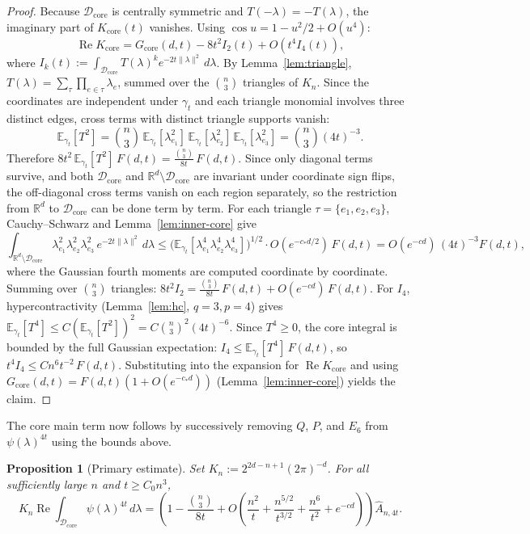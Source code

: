 \documentclass[11pt]{article}
\newtheorem{proposition}[theorem]{Proposition}
\theoremstyle{definition}
\newcommand{\R}{\mathbb{R}}
\newcommand{\E}{\mathbb{E}}
\newcommand{\corereg}{\mathcal{D}_\mathrm{core}}
\newcommand{\RePart}{\operatorname{Re}}
\newcommand{\core}{G_{\mathrm{core}}}
\newcommand{\Ahat}{\hat A_{n,4t}}
\begin{document}
\begin{proof}
Because \(\corereg\) is centrally symmetric and \(T(-\lambda)=-T(\lambda)\), the imaginary part of \(K_{\mathrm{core}}(t)\) vanishes. Using \(\cos u=1-u^2/2+O(u^4)\):
\[
  \RePart K_{\mathrm{core}}=\core(d,t)-8t^2 I_2(t)+O(t^4 I_4(t)),
\]
where \(I_k(t):=\int_{\corereg}T(\lambda)^k e^{-2t\|\lambda\|^2}\,d\lambda\).
By Lemma~\ref{lem:triangle}, \(T(\lambda)=\sum_\tau\prod_{e\in\tau}\lambda_e\), summed over the \(\binom n3\) triangles of \(K_n\). Since the coordinates are independent under \(\gamma_t\) and each triangle monomial involves three distinct edges, cross terms with distinct triangle supports vanish:
\[
  \E_{\gamma_t}[T^2]
  =\binom{n}{3}\,\E_{\gamma_t}[\lambda_{e_1}^2]\,\E_{\gamma_t}[\lambda_{e_2}^2]\,\E_{\gamma_t}[\lambda_{e_3}^2]
  =\binom{n}{3}(4t)^{-3}.
\]
Therefore \(8t^2\,\E_{\gamma_t}[T^2]\,F(d,t)=\frac{\binom{n}{3}}{8t}\,F(d,t)\).
Since only diagonal terms survive, and both \(\corereg\) and \(\R^d\setminus\corereg\) are invariant under coordinate sign flips, the off-diagonal cross terms vanish on each region separately, so the restriction from \(\R^d\) to \(\corereg\) can be done term by term. For each triangle \(\tau=\{e_1,e_2,e_3\}\), Cauchy--Schwarz and Lemma~\ref{lem:inner-core} give
\[
  \int_{\R^d\setminus\corereg}\!\lambda_{e_1}^2\lambda_{e_2}^2\lambda_{e_3}^2\,e^{-2t\|\lambda\|^2}\,d\lambda
  \le
  \bigl(\E_{\gamma_t}[\lambda_{e_1}^4\lambda_{e_2}^4\lambda_{e_3}^4]\bigr)^{1/2}\!
  \cdot O(e^{-c_*d/2})\,F(d,t)
  =O(e^{-cd})\,(4t)^{-3}F(d,t),
\]
where the Gaussian fourth moments are computed coordinate by coordinate. Summing over \(\binom{n}{3}\) triangles:
\(8t^2 I_2=\frac{\binom{n}{3}}{8t}\,F(d,t)+O(e^{-cd})\,F(d,t)\).
For \(I_4\), hypercontractivity (Lemma~\ref{lem:hc}, \(q=3,p=4\)) gives
\(\E_{\gamma_t}[T^4]\le C(\E_{\gamma_t}[T^2])^2=C\binom{n}{3}^2(4t)^{-6}\).
Since \(T^4\ge 0\), the core integral is bounded by the full Gaussian expectation: \(I_4\le \E_{\gamma_t}[T^4]\,F(d,t)\), so \(t^4 I_4\le Cn^6 t^{-2}\,F(d,t)\).
Substituting into the expansion for \(\RePart K_{\mathrm{core}}\) and using \(\core(d,t)=F(d,t)(1+O(e^{-c_*d}))\) (Lemma~\ref{lem:inner-core}) yields the claim.
\end{proof}

The core main term now follows by successively removing \(Q\), \(P\), and \(E_6\) from \(\psi(\lambda)^{4t}\) using the bounds above.

\begin{proposition}[Primary estimate]\label{prop:primary-box}
Set \(K_n:=2^{2d-n+1}(2\pi)^{-d}\).
For all sufficiently large \(n\) and \(t\ge C_0n^3\),
\[
  K_n\RePart\int_{\corereg}\psi(\lambda)^{4t}\,d\lambda
  =\left(1-\frac{\binom{n}{3}}{8t}
  +O\!\left(\frac{n^2}{t}+\frac{n^{5/2}}{t^{3/2}}+\frac{n^6}{t^2}+e^{-cd}\right)\right)\Ahat.
\]
\end{proposition}
\end{document}
